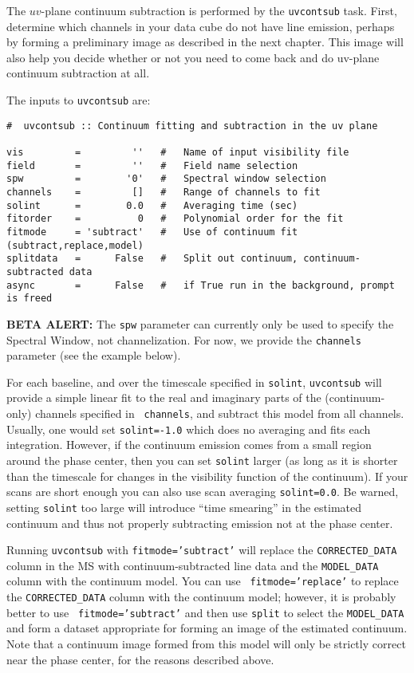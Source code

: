 The $uv$-plane continuum subtraction is performed by the {\tt uvcontsub} task.
First, determine which channels in your data cube do not have line
emission, perhaps by forming a preliminary image as described in the
next chapter.  This image will also help you decide whether or not you
need to come back and do uv-plane continuum subtraction at all.

The inputs to {\tt uvcontsub} are:
\small
\begin{verbatim}
#  uvcontsub :: Continuum fitting and subtraction in the uv plane

vis         =         ''   #   Name of input visibility file
field       =         ''   #   Field name selection
spw         =        '0'   #   Spectral window selection
channels    =         []   #   Range of channels to fit
solint      =        0.0   #   Averaging time (sec)
fitorder    =          0   #   Polynomial order for the fit
fitmode     = 'subtract'   #   Use of continuum fit (subtract,replace,model)
splitdata   =      False   #   Split out continuum, continuum-subtracted data
async       =      False   #   if True run in the background, prompt is freed
\end{verbatim}
\normalsize

{\bf BETA ALERT:} The {\tt spw} parameter can currently only be used
to specify the Spectral Window, not channelization.  For now, we
provide the {\tt channels} parameter (see the example below).

For each baseline, and over the timescale specified in {\tt solint},
{\tt uvcontsub} will provide a simple linear fit to the real and
imaginary parts of the (continuum-only) channels specified in {\tt
channels}, and subtract this model from all channels.  
Usually, one would set {\tt solint=-1.0} which does no
averaging and fits each integration.  However, if the continuum
emission comes from a small region around the phase center, then
you can set {\tt solint} larger (as long as it is 
shorter than the timescale for changes in the
visibility function of the continuum).
If your scans are short enough you can also use scan averaging 
{\tt solint=0.0}.  Be warned, setting {\tt solint} too large will
introduce ``time smearing'' in the estimated continuum and thus not
properly subtracting emission not at the phase center.  

Running {\tt uvcontsub} with {\tt fitmode='subtract'} will replace the
{\tt CORRECTED\_DATA} column in the MS with continuum-subtracted line data
and the {\tt MODEL\_DATA} column with the continuum model.  You can use {\tt
fitmode='replace'} to replace the {\tt CORRECTED\_DATA} column with the
continuum model; however, it is probably better to use {\tt
fitmode='subtract'} and then use {\tt split} to select the {\tt MODEL\_DATA}
and form a dataset appropriate for forming an image of the estimated
continuum.  Note that a continuum image formed from this model will
only be strictly correct near the phase center, for the reasons
described above.

